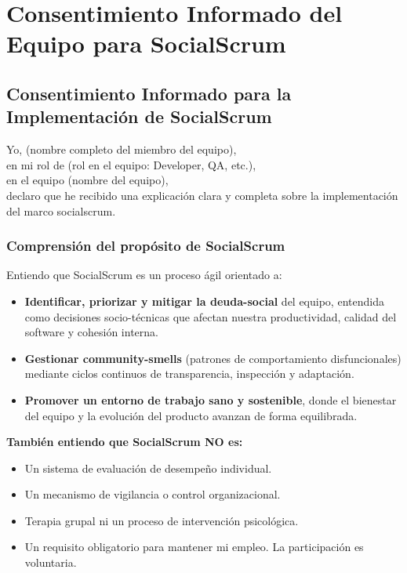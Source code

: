 \chapter{Consentimiento Informado del Equipo para SocialScrum}
\label{anexo:consentimiento}

\section{Consentimiento Informado para la Implementación de SocialScrum}

\noindent
Yo, \underline{\hspace{6cm}} (nombre completo del miembro del equipo),\\[0.3cm]
en mi rol de \underline{\hspace{5cm}} (rol en el equipo: Developer, QA, etc.),\\[0.3cm]
en el equipo \underline{\hspace{5cm}} (nombre del equipo),\\[0.3cm]
declaro que he recibido una explicación clara y completa sobre la implementación del marco \gls{socialscrum}.

\subsection{Comprensión del propósito de SocialScrum}
Entiendo que SocialScrum es un proceso ágil orientado a:

\begin{itemize}
    \item \textbf{Identificar, priorizar y mitigar la \gls{deuda-social}} del equipo, entendida como decisiones socio-técnicas que afectan nuestra productividad, calidad del software y cohesión interna.
    \item \textbf{Gestionar \gls{community-smells}} (patrones de comportamiento disfuncionales) mediante ciclos continuos de transparencia, inspección y adaptación.
    \item \textbf{Promover un entorno de trabajo sano y sostenible}, donde el bienestar del equipo y la evolución del producto avanzan de forma equilibrada.
\end{itemize}

\textbf{También entiendo que SocialScrum NO es:}

\begin{itemize}
    \item Un sistema de evaluación de desempeño individual.
    \item Un mecanismo de vigilancia o control organizacional.
    \item Terapia grupal ni un proceso de intervención psicológica.
    \item Un requisito obligatorio para mantener mi empleo. La participación es voluntaria.
\end{itemize}

